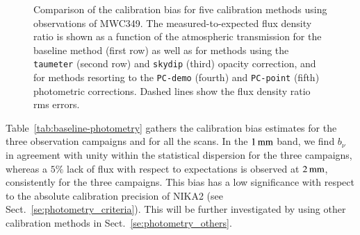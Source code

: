 \documentclass[traditionalabstract]{aa}
\begin{document}
\begin{figure}[!thbp]
\begin{center}
    \vspace{-0.3cm}
    \caption[Calibration bias comparison]{Comparison of the
        calibration bias for five calibration methods using
          observations of MWC349.
       The measured-to-expected flux density ratio is shown as a
      function of the atmospheric transmission for the baseline method
      (first row) as well as for methods using the {\tt taumeter} (second
      row) and {\tt skydip} (third) opacity correction, and for methods
      resorting to the {\tt PC-demo} (fourth) and {\tt PC-point} (fifth)
      photometric corrections. Dashed lines
      show the flux density ratio rms errors.}
    \label{fig:mwc349_obstau_others}
  \end{center}
\end{figure}
%
Table~\ref{tab:baseline-photometry} gathers the calibration bias
estimates for the three observation campaigns and for all the scans.
In the $1\,\rm{mm}$ band, we find
$b_\nu$ in agreement with unity within the statistical dispersion for
the three campaigns,
whereas a $5\%$ lack of flux with respect to expectations is observed
at $2\,\rm{mm}$, consistently for the three campaigns. This bias has a
low significance with respect to the absolute calibration precision of
NIKA2 (see Sect.~\ref{se:photometry_criteria}).
This will be further investigated by using other calibration methods
in Sect.~\ref{se:photometry_others}.
\end{document}
